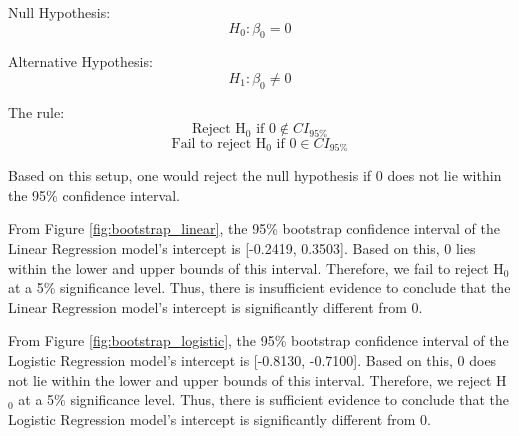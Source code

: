 \begin{enumerate}
          Null Hypothesis:
          \[H_0: \beta_0 = 0\]

          Alternative Hypothesis:
          \[H_1: \beta_0 \neq 0\]

          The rule:
          \[\text{Reject H$_0$ if 0} \notin CI_{95\%}\]
          \[\text{Fail to reject H$_0$ if 0} \in CI_{95\%}\]

          Based on this setup, one would reject the null hypothesis if 0 does not lie within the 95\% confidence interval.

          From Figure \ref{fig:bootstrap_linear}, the 95\% bootstrap confidence interval of the Linear Regression model's intercept is [-0.2419, 0.3503]. Based on this, 0 lies
          within the lower and upper bounds of this interval. Therefore, we fail to reject H$_0$ at a 5\% significance level. Thus, there is insufficient evidence to conclude
          that the Linear Regression model's intercept is significantly different from 0.

          From Figure \ref{fig:bootstrap_logistic}, the 95\% bootstrap confidence interval of the Logistic Regression model's intercept is [-0.8130, -0.7100]. Based on this, 
          0 does not lie within the lower and upper bounds of this interval. Therefore, we reject H$_0$ at a 5\% significance level. Thus, there is sufficient evidence to conclude
          that the Logistic Regression model's intercept is significantly different from 0.

\end{enumerate}
